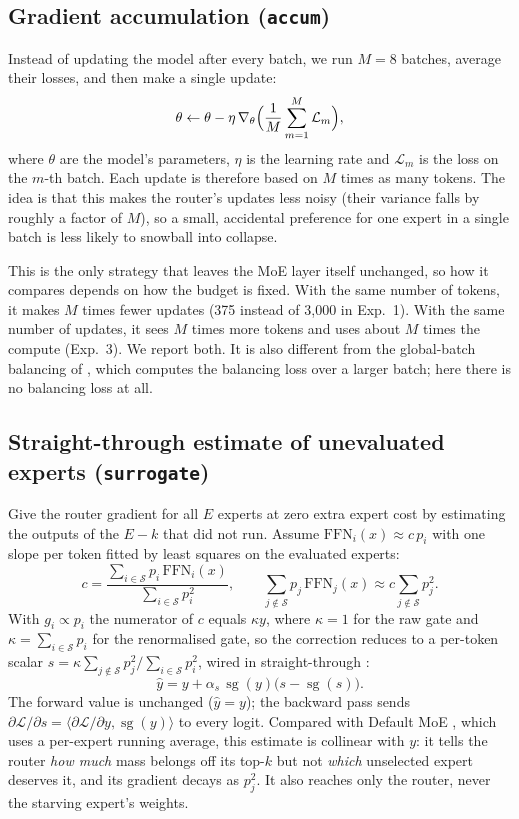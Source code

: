 \documentclass[10pt]{article}
\theoremstyle{definition}
\theoremstyle{remark}
\newcommand{\FFN}{\mathrm{FFN}}
\newcommand{\sg}{\operatorname{sg}}
\newcommand{\code}[1]{\texttt{#1}}
\begin{document}
\subsection{Gradient accumulation (\code{accum})}
Instead of updating the model after every batch, we run $M=8$ batches, average their losses, and then make a single update:
\begin{equation}
\theta \leftarrow \theta - \eta\,\nabla_\theta\Bigl(\frac{1}{M}\sum_{m=1}^{M}\mathcal{L}_m\Bigr),
\end{equation}
where $\theta$ are the model's parameters, $\eta$ is the learning rate and $\mathcal{L}_m$ is the loss on the $m$-th batch. Each update is therefore based on $M$ times as many tokens. The idea is that this makes the router's updates less noisy (their variance falls by roughly a factor of $M$), so a small, accidental preference for one expert in a single batch is less likely to snowball into collapse.

This is the only strategy that leaves the MoE layer itself unchanged, so how it compares depends on how the budget is fixed. With the same number of tokens, it makes $M$ times fewer updates (375 instead of 3{,}000 in Exp.~1). With the same number of updates, it sees $M$ times more tokens and uses about $M$ times the compute (Exp.~3). We report both. It is also different from the global-batch balancing of \citet{qiu2025demons}, which computes the balancing loss over a larger batch; here there is no balancing loss at all.

\subsection{Straight-through estimate of unevaluated experts (\code{surrogate})}
\label{sec:surrogate}
Give the router gradient for all $E$ experts at zero extra expert cost by estimating the outputs of the $E-k$ that did not run. Assume $\FFN_i(x)\approx c\,p_i$ with one slope per token fitted by least squares on the evaluated experts:
\begin{equation}
c=\frac{\sum_{i\in\mathcal{S}}p_i\,\FFN_i(x)}{\sum_{i\in\mathcal{S}}p_i^2}, \qquad
\sum_{j\notin\mathcal{S}}p_j\,\FFN_j(x)\approx c\sum_{j\notin\mathcal{S}}p_j^2 .
\end{equation}
With $g_i\propto p_i$ the numerator of $c$ equals $\kappa y$, where $\kappa=1$ for the raw gate and $\kappa=\sum_{i\in\mathcal{S}}p_i$ for the renormalised gate, so the correction reduces to a per-token scalar $s=\kappa\sum_{j\notin\mathcal{S}}p_j^2/\sum_{i\in\mathcal{S}}p_i^2$, wired in straight-through \citep{bengio2013estimating}:
\begin{equation}
\hat y = y + \alpha_s\,\sg(y)\bigl(s-\sg(s)\bigr).
\end{equation}
The forward value is unchanged ($\hat y=y$); the backward pass sends $\partial\mathcal{L}/\partial s=\langle\partial\mathcal{L}/\partial y,\sg(y)\rangle$ to every logit. Compared with Default MoE \citep{panda2025dense}, which uses a per-expert running average, this estimate is collinear with $y$: it tells the router \emph{how much} mass belongs off its top-$k$ but not \emph{which} unselected expert deserves it, and its gradient decays as $p_j^2$. It also reaches only the router, never the starving expert's weights.
\end{document}
